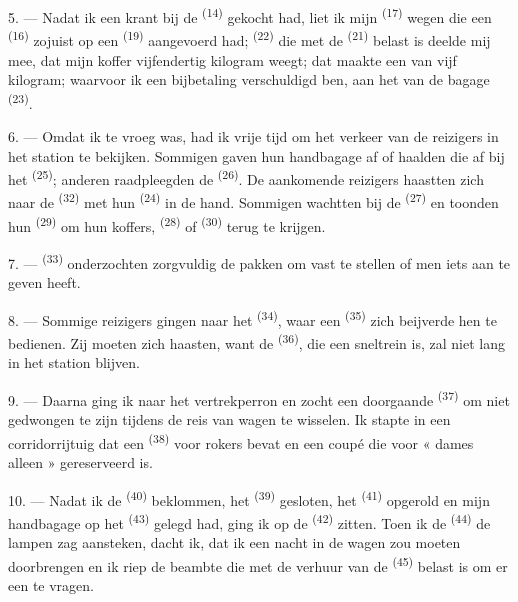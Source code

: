 5. --- Nadat ik een krant bij de  \textsuperscript{(14)} gekocht had, liet
ik mijn  \textsuperscript{(17)} wegen die een
 \textsuperscript{(16)} zojuist op een 
\textsuperscript{(19)} aangevoerd had;  \textsuperscript{(22)} die met de
 \textsuperscript{(21)} belast is deelde mij mee, dat mijn koffer
vijfendertig kilogram weegt; dat maakte een
 van vijf kilogram; waarvoor ik een bijbetaling verschuldigd
ben, aan het  van de bagage \textsuperscript{(23)}.

6. --- Omdat ik te vroeg was, had ik vrije tijd om het verkeer van de reizigers in het station
te bekijken. Sommigen gaven hun handbagage af of haalden die af bij het 
\textsuperscript{(25)}; anderen raadpleegden de
 \textsuperscript{(26)}. De aankomende reizigers
haastten zich naar de  \textsuperscript{(32)} met hun
 \textsuperscript{(24)} in de hand. Sommigen wachtten bij de
 \textsuperscript{(27)} en toonden hun 
\textsuperscript{(29)} om hun koffers,  \textsuperscript{(28)} of
 \textsuperscript{(30)} terug te krijgen.

7. ---  \textsuperscript{(33)} onderzochten zorgvuldig de
pakken om vast te stellen of men iets aan te geven heeft.

8. --- Sommige reizigers gingen naar het  \textsuperscript{(34)}, waar een
 \textsuperscript{(35)} zich beijverde hen te bedienen. Zij moeten zich
haasten, want de  \textsuperscript{(36)}, die een sneltrein is, zal niet lang in
het station blijven.

9. --- Daarna ging ik naar het vertrekperron en zocht een doorgaande
 \textsuperscript{(37)} om niet gedwongen te zijn tijdens de reis
van wagen te wisselen. Ik stapte in een corridorrijtuig dat een
 \textsuperscript{(38)} voor rokers bevat en een coupé die voor
« dames alleen » gereserveerd is.

\VUsaut{3.0mm}

10. --- Nadat ik de  \textsuperscript{(40)} beklommen, het
 \textsuperscript{(39)} gesloten, het 
\textsuperscript{(41)} opgerold en mijn handbagage op het  \textsuperscript{(43)}
gelegd had, ging ik op de  \textsuperscript{(42)} zitten. Toen ik de
 \textsuperscript{(44)} de lampen zag aansteken, dacht ik, dat ik een nacht
in de wagen zou moeten doorbrengen en ik riep de beambte die met de verhuur van de
 \textsuperscript{(45)} belast is om er een te vragen.

